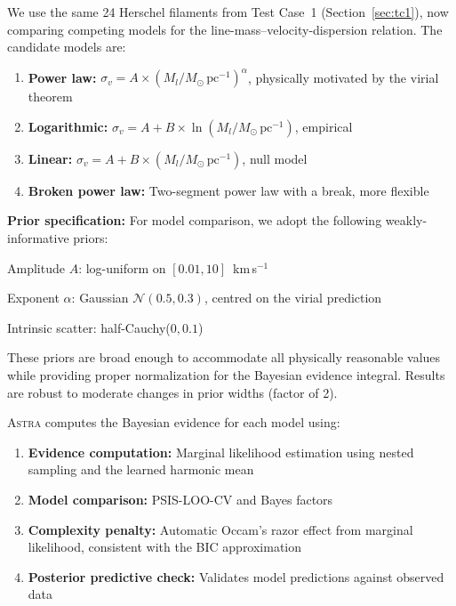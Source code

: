 \documentclass[usenatbib]{rasti}
\newcommand{\astra}{\textsc{Astra}\xspace}
\begin{document}
We use the same 24 Herschel filaments from Test Case~1 (Section~\ref{sec:tc1}), now comparing competing models for the line-mass--velocity-dispersion relation.
The candidate models are:
\begin{enumerate}
  \item[(i)] \textbf{Power law:} $\sigma_v = A \times (M_l/M_\odot\,\mathrm{pc}^{-1})^{\alpha}$, physically motivated by the virial theorem
  \item[(ii)] \textbf{Logarithmic:} $\sigma_v = A + B \times \ln(M_l/M_\odot\,\mathrm{pc}^{-1})$, empirical
  \item[(iii)] \textbf{Linear:} $\sigma_v = A + B \times (M_l/M_\odot\,\mathrm{pc}^{-1})$, null model
  \item[(iv)] \textbf{Broken power law:} Two-segment power law with a break, more flexible
\end{enumerate}

\textbf{Prior specification:}
For model comparison, we adopt the following weakly-informative priors:
\begin{description}
  \item Amplitude $A$: log-uniform on $[0.01, 10]$~km\,s$^{-1}$
  \item Exponent $\alpha$: Gaussian $\mathcal{N}(0.5, 0.3)$, centred on the virial prediction
  \item Intrinsic scatter: half-Cauchy($0, 0.1$)
\end{description}
These priors are broad enough to accommodate all physically reasonable values while providing proper normalization for the Bayesian evidence integral.
Results are robust to moderate changes in prior widths (factor of 2).

\astra computes the Bayesian evidence for each model using:
\begin{enumerate}
  \item[(i)] \textbf{Evidence computation:} Marginal likelihood estimation using nested sampling and the learned harmonic mean \citep{SpurioMancini+2023}
  \item[(ii)] \textbf{Model comparison:} PSIS-LOO-CV and Bayes factors \citep{Eadie+2023}
  \item[(iii)] \textbf{Complexity penalty:} Automatic Occam's razor effect from marginal likelihood, consistent with the BIC approximation \citep{Schwarz1978}
  \item[(iv)] \textbf{Posterior predictive check:} Validates model predictions against observed data
\end{enumerate}
\end{document}
